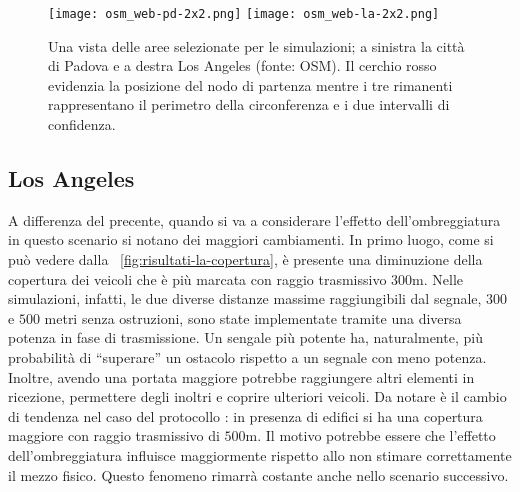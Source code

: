 %
\begin{figure}[htbp]
	\centering
		\texttt{[image: osm\_web-pd-2x2.png]}
		\hfill
		\texttt{[image: osm\_web-la-2x2.png]}
\caption{Una vista delle aree selezionate per le simulazioni; a sinistra la città di Padova e a destra Los Angeles (fonte: OSM).
Il cerchio rosso evidenzia la posizione del nodo di partenza mentre i tre rimanenti rappresentano il perimetro della circonferenza
e i due intervalli di confidenza.\label{fig:scenari-la-pd-osm}}
\end{figure}
%
\subsection{Los Angeles}\label{subsec:risultati-la}
A differenza del precente, quando si va a considerare l'effetto dell'ombreggiatura in questo scenario
si notano dei maggiori cambiamenti.
In primo luogo, come si può vedere dalla \figurename~\ref{fig:risultati-la-copertura},
è presente una diminuzione della copertura dei veicoli che è più marcata con raggio trasmissivo $300$m.
Nelle simulazioni, infatti, le due diverse distanze massime raggiungibili dal segnale,
$300$ e $500$ metri senza ostruzioni, sono state implementate tramite una diversa potenza in fase di trasmissione.
Un sengale più potente ha, naturalmente,
più probabilità di ``superare'' un ostacolo rispetto a un segnale con meno potenza.
Inoltre, avendo una portata maggiore potrebbe raggiungere altri elementi in ricezione,
permettere degli inoltri e coprire ulteriori veicoli.
Da notare è il cambio di tendenza nel caso del protocollo \statica{}:
in presenza di edifici si ha una copertura maggiore con raggio trasmissivo di $500$m.
Il motivo potrebbe essere che l'effetto dell'ombreggiatura influisce maggiormente rispetto
allo non stimare correttamente il mezzo fisico.
Questo fenomeno rimarrà costante anche nello scenario successivo.

